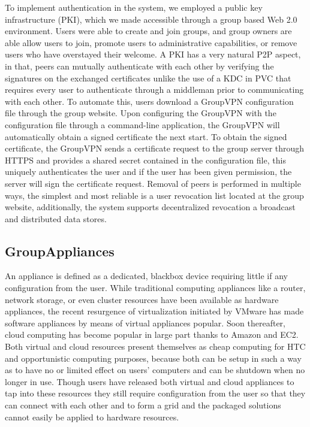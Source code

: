 \documentclass{sig-alternate}
\begin{document}
To implement authentication in the system, we employed a public key
infrastructure (PKI), which we made accessible through a group based Web 2.0
environment.  Users were able to create and join groups, and group owners are
able allow users to join, promote users to administrative capabilities, or
remove users who have overstayed their welcome.  A PKI has a very natural P2P
aspect, in that, peers can mutually authenticate with each other by verifying
the signatures on the exchanged certificates unlike the use of a KDC in PVC
that requires every user to authenticate through a middleman prior to
communicating with each other.  To automate this, users download a GroupVPN
configuration file through the group website.  Upon configuring the GroupVPN
with the configuration file through a command-line application, the GroupVPN
will automatically obtain a signed certificate the next start.  To obtain the
signed certificate, the GroupVPN sends a certificate request to the group
server through HTTPS and provides a shared secret contained in the
configuration file, this uniquely authenticates the user and if the user has
been given permission, the server will sign the certificate request.  Removal
of peers is performed in multiple ways, the simplest and most reliable is a
user revocation list located at the group website, additionally, the system
supports decentralized revocation a broadcast and distributed data stores.

\subsection{GroupAppliances}
An appliance is defined as a dedicated, blackbox device requiring little if any
configuration from the user.  While traditional computing appliances like a
router, network storage, or even cluster resources have been available as
hardware appliances, the recent resurgence of virtualization initiated by
VMware has made software appliances by means of virtual appliances popular.
Soon thereafter, cloud computing has become popular in large part thanks to
Amazon and EC2.  Both virtual and cloud resources present themselves as cheap
computing for HTC and opportunistic computing purposes, because both can be
setup in such a way as to have no or limited effect on users' computers and
can be shutdown when no longer in use.  Though users have released both virtual
and cloud appliances to tap into these resources they still require
configuration from the user so that they can connect with each other and to form
a grid and the packaged solutions cannot easily be applied to hardware resources.
\end{document}
